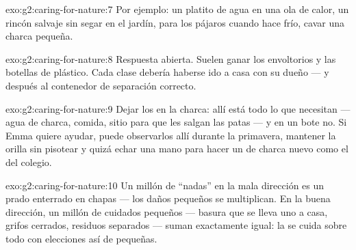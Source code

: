 \begin{solution}{exo:g2:caring-for-nature:7}
Por ejemplo: un platito de agua en una ola de calor, un rincón salvaje
sin segar en el jardín,  para los pájaros cuando hace frío,
cavar una charca pequeña.
\end{solution}

\begin{solution}{exo:g2:caring-for-nature:8}
Respuesta abierta. Suelen ganar los envoltorios y las botellas de
plástico. Cada clase debería haberse ido a casa con su dueño --- y
después al contenedor de separación correcto.
\end{solution}

\begin{solution}{exo:g2:caring-for-nature:9}
Dejar los  en la charca: allí está todo lo que necesitan ---
agua de charca, comida, sitio para que les salgan las patas --- y en
un bote no. Si Emma quiere ayudar, puede observarlos allí durante la
primavera, mantener la orilla sin pisotear y quizá echar una mano para
hacer un  de charca nuevo como el del colegio.
\end{solution}

\begin{solution}{exo:g2:caring-for-nature:10}
Un millón de ``nadas'' en la mala dirección es un prado enterrado en
chapas --- los daños pequeños se multiplican. En la buena dirección,
un millón de cuidados pequeños --- basura que se lleva uno a casa,
grifos cerrados, residuos separados --- suman exactamente igual: la
 se cuida sobre todo con elecciones así de pequeñas.
\end{solution}
